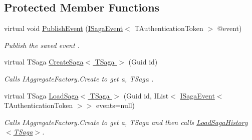 \subsection*{Protected Member Functions}
\begin{DoxyCompactItemize}
\item 
virtual void \hyperlink{classCqrs_1_1Domain_1_1SagaRepository_a1dec03959e4d859c6cf2be0507b1bc05_a1dec03959e4d859c6cf2be0507b1bc05}{Publish\+Event} (\hyperlink{interfaceCqrs_1_1Events_1_1ISagaEvent}{I\+Saga\+Event}$<$ T\+Authentication\+Token $>$ @event)
\begin{DoxyCompactList}\small\item\em Publish the saved {\itshape event} . \end{DoxyCompactList}\item 
virtual T\+Saga \hyperlink{classCqrs_1_1Domain_1_1SagaRepository_acb23e0bd3e5655547a13b4ad2b06e548_acb23e0bd3e5655547a13b4ad2b06e548}{Create\+Saga$<$ T\+Saga $>$} (Guid id)
\begin{DoxyCompactList}\small\item\em Calls I\+Aggregate\+Factory.\+Create to get a, {\itshape T\+Saga} . \end{DoxyCompactList}\item 
virtual T\+Saga \hyperlink{classCqrs_1_1Domain_1_1SagaRepository_acc59a4478bb992b03690f0cda3e4e362_acc59a4478bb992b03690f0cda3e4e362}{Load\+Saga$<$ T\+Saga $>$} (Guid id, I\+List$<$ \hyperlink{interfaceCqrs_1_1Events_1_1ISagaEvent}{I\+Saga\+Event}$<$ T\+Authentication\+Token $>$$>$ events=null)
\begin{DoxyCompactList}\small\item\em Calls I\+Aggregate\+Factory.\+Create to get a, {\itshape T\+Saga}  and then calls \hyperlink{classCqrs_1_1Domain_1_1SagaRepository_af6af9066681e47bc4ff2e14358321fb8_af6af9066681e47bc4ff2e14358321fb8}{Load\+Saga\+History$<$\+T\+Saga$>$}. \end{DoxyCompactList}\end{DoxyCompactItemize}
